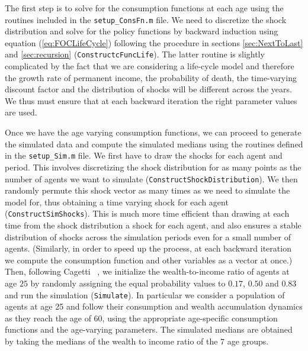 \documentclass[titlepage]{\econtex}
\begin{document}
  The first step is to solve for the consumption functions at each age
  using the routines included in the \texttt{setup\_ConsFn.m} file. We
  need to discretize the shock distribution and solve for the policy
  functions by backward induction using equation (\ref{eq:FOCLifeCycle})
  following the procedure in sections \ref{sec:NextToLast} and
  \ref{sec:recursion} (\texttt{ConstructcFuncLife}). The latter routine
  is slightly complicated by the fact that we are considering a
  life-cycle model and therefore the growth rate of permanent income,
  the probability of death, the time-varying discount factor and the
  distribution of shocks will be different across the years. We thus
  must ensure that at each backward iteration the right parameter
  values are used.

  Once we have the age varying consumption functions, we can proceed to
  generate the simulated data and compute the simulated medians using
  the routines defined in the \texttt{setup\_Sim.m} file. We first have
  to draw the shocks for each agent and period. This involves
  discretizing the shock distribution for as many points as the number
  of agents we want to simulate
  (\texttt{ConstructShockDistribution}). We then randomly permute this
  shock vector as many times as we need to simulate the model for, thus
  obtaining a time varying shock for each agent
  (\texttt{ConstructSimShocks}). This is much more time efficient than
  drawing at each time from the shock distribution a shock for each
  agent, and also ensures a stable distribution of shocks across the
  simulation periods even for a small number of agents. (Similarly, in
  order to speed up the process, at each backward iteration we compute
  the consumption function and other variables as a vector at once.)
  Then, following Cagetti ~\citeyearpar{cagettiWprofiles}, we
  initialize the wealth-to-income ratio of agents at age $25$ by
  randomly assigning the equal probability values to $0.17$, $0.50$ and
  $0.83$ and run the simulation (\texttt{Simulate}). In particular we
  consider a population of agents at age 25 and follow their consumption
  and wealth accumulation dynamics as they reach the age of $60$, using
  the appropriate age-specific consumption functions and the age-varying
  parameters. The simulated medians are obtained by taking the medians
  of the wealth to income ratio of the $7$ age groups.
\end{document}

